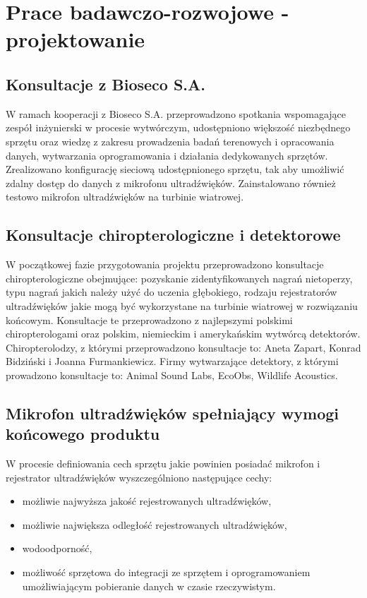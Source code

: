 \documentclass{sprz}
\begin{document}
\chapter{Prace badawczo-rozwojowe - projektowanie}

\section{Konsultacje z Bioseco S.A.}
W ramach kooperacji z Bioseco S.A. przeprowadzono spotkania wspomagające zespół inżynierski w procesie wytwórczym, udostępniono większość niezbędnego sprzętu oraz wiedzę z zakresu prowadzenia badań terenowych i opracowania danych, wytwarzania oprogramowania i działania dedykowanych sprzętów. Zrealizowano konfigurację sieciową udostępnionego sprzętu, tak aby umożliwić zdalny dostęp do danych z mikrofonu ultradźwięków. Zainstalowano również testowo mikrofon ultradźwięków na turbinie wiatrowej.

\section{Konsultacje chiropterologiczne i detektorowe}
W początkowej fazie przygotowania projektu przeprowadzono konsultacje chiropterologiczne obejmujące: pozyskanie zidentyfikowanych nagrań nietoperzy, typu nagrań jakich należy użyć do uczenia głębokiego, rodzaju rejestratorów ultradźwięków jakie mogą być wykorzystane na turbinie wiatrowej w rozwiązaniu końcowym. Konsultacje te przeprowadzono z najlepszymi polskimi chiropterologami oraz polskim, niemieckim i amerykańskim wytwórcą detektorów. Chiropterolodzy, z którymi przeprowadzono konsultacje to: Aneta Zapart, Konrad Bidziński i Joanna Furmankiewicz. Firmy wytwarzające detektory, z którymi prowadzono konsultacje to: Animal Sound Labs, EcoObs, Wildlife Acoustics.

\section{Mikrofon ultradźwięków spełniający wymogi końcowego produktu}
W procesie definiowania cech sprzętu jakie powinien posiadać mikrofon i rejestrator ultradźwięków wyszczególniono następujące cechy:
  \begin{itemize}
    \item{możliwie najwyższa jakość rejestrowanych ultradźwięków,}
    \item{możliwie największa odległość rejestrowanych ultradźwięków,}
    \item{wodoodporność,}
    \item{możliwość sprzętowa do integracji ze sprzętem i oprogramowaniem umożliwiającym pobieranie danych w czasie rzeczywistym.}
  \end{itemize}
\end{document}
